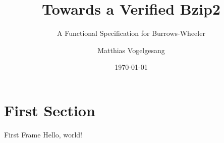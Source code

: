 \documentclass{beamer}
\title{Towards a Verified Bzip2}
\subtitle{A Functional Specification for Burrows-Wheeler}
\date{\today}
\author{Matthias Vogelgesang}
\institute{Centre for Modern Beamer Themes}
\begin{document}
  \maketitle
  \section{First Section}
  \begin{frame}{First Frame}
    Hello, world!
  \end{frame}
\end{document}
